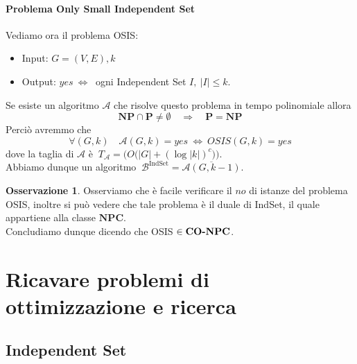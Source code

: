 \documentclass[a4paper]{article}
\theoremstyle{definition}
\newtheorem{obs}{Osservazione}[subsection]
\newcommand{\p}{\mathbf{P}}
\newcommand{\np}{\mathbf{NP}}
\newcommand{\npc}{\mathbf{NPC}}
\newcommand{\alg}[1]{\mathcal{#1}}
\begin{document}
		\paragraph{Problema Only Small Independent Set} Vediamo ora il problema OSIS:
		\begin{itemize}
			\item Input: $ G = (V, E), k $
			\item Output: $ yes\ \Leftrightarrow\ $ ogni Independent Set $ I,\ \big| I \big| \leq k $.
		\end{itemize}
		
		Se esiste un algoritmo $ \alg{A} $ che risolve questo problema in tempo polinomiale allora 
		\[ 
			\np \cap \p \neq \emptyset\quad \Rightarrow\quad \p = \np 
		\]
		Perciò avremmo che
		\[
			\forall (G, k)\quad \alg{A}(G, k) = yes\ \Leftrightarrow\ OSIS(G, k) = yes
		\]
		dove la taglia di $ \alg{A} $ è 
		$ \ T_{\alg{A}} = \Big( O\big(\big| G \big| + (\log \big|k \big|)^c\big) \Big) $.\\
		
		Abbiamo dunque un algoritmo $\ \alg{B}^{\text{IndSet}} = \overline{\alg{A}(G, k-1)} $.
		
		\begin{obs}
			Osserviamo che è facile verificare il $ no $ di istanze del problema OSIS, inoltre si può vedere che tale problema è il duale di IndSet, il quale appartiene alla classe $ \npc $.\\
			Concludiamo dunque dicendo che OSIS $ \in \text{\textbf{CO-}}\npc $.
		\end{obs}
		
		\newpage
		
	\section{Ricavare problemi di ottimizzazione e ricerca}
		
		\subsection{Independent Set}
		
\end{document}
